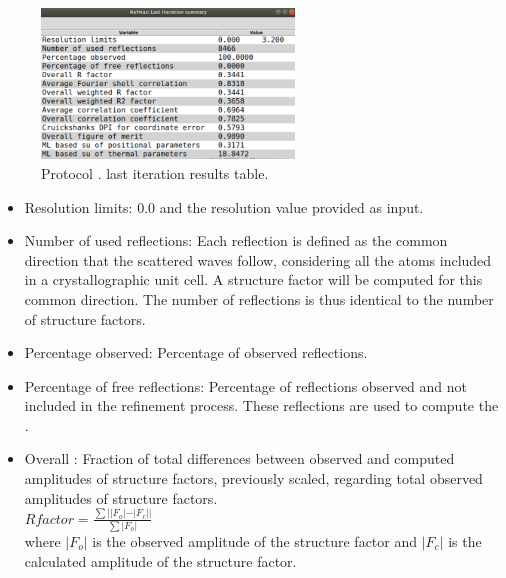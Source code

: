 \begin{itemize}
\begin{itemize}
\begin{figure}[H]
         \centering 
         \captionsetup{width=.7\linewidth} 
         \includegraphics[width=0.60\textwidth]{Images_appendix/Fig132.pdf}
         \caption{Protocol .  last iteration results table.}
         \label{fig:app_protocol_refmac_7}
        \end{figure}
     
     \begin{itemize}
     \item Resolution limits: 0.0 and the resolution value provided as input.
     
     \item Number of used reflections: Each reflection is defined as the common direction that the scattered waves follow, considering all the atoms included in a crystallographic unit cell. A structure factor will be computed for this common direction. The number of reflections is thus identical to the number of structure factors.
     
     \item Percentage observed: Percentage of observed reflections.
     
     \item Percentage of free reflections: Percentage of reflections observed and not included in the refinement process. These reflections are used to compute the .
     
     \item Overall : Fraction of total differences between observed and computed amplitudes of structure factors, previously scaled, regarding total observed amplitudes of structure factors.\\
     
     \begin{math}
     R factor = \frac{\sum||F_o|-|F_c||}{\sum|F_o|} 
     \end{math}\\
     
     where $|F_o|$ is the observed amplitude of the structure factor and $|F_c|$ is the calculated amplitude of the structure factor.
     

\end{itemize}
\end{itemize}
\end{itemize}
